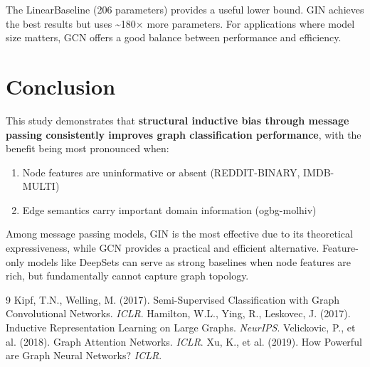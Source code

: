 \documentclass[11pt]{article}
\begin{document}
The LinearBaseline (206 parameters) provides a useful lower bound. GIN achieves the best results but uses \textasciitilde180$\times$ more parameters. For applications where model size matters, GCN offers a good balance between performance and efficiency.

\section{Conclusion}

This study demonstrates that \textbf{structural inductive bias through message passing consistently improves graph classification performance}, with the benefit being most pronounced when:
\begin{enumerate}
    \item Node features are uninformative or absent (REDDIT-BINARY, IMDB-MULTI)
    \item Edge semantics carry important domain information (ogbg-molhiv)
\end{enumerate}

Among message passing models, GIN is the most effective due to its theoretical expressiveness, while GCN provides a practical and efficient alternative. Feature-only models like DeepSets can serve as strong baselines when node features are rich, but fundamentally cannot capture graph topology.

\begin{thebibliography}{9}
 Kipf, T.N., Welling, M. (2017). Semi-Supervised Classification with Graph Convolutional Networks. \textit{ICLR}.
 Hamilton, W.L., Ying, R., Leskovec, J. (2017). Inductive Representation Learning on Large Graphs. \textit{NeurIPS}.
 Velickovic, P., et al. (2018). Graph Attention Networks. \textit{ICLR}.
 Xu, K., et al. (2019). How Powerful are Graph Neural Networks? \textit{ICLR}.
\end{thebibliography}
\end{document}
